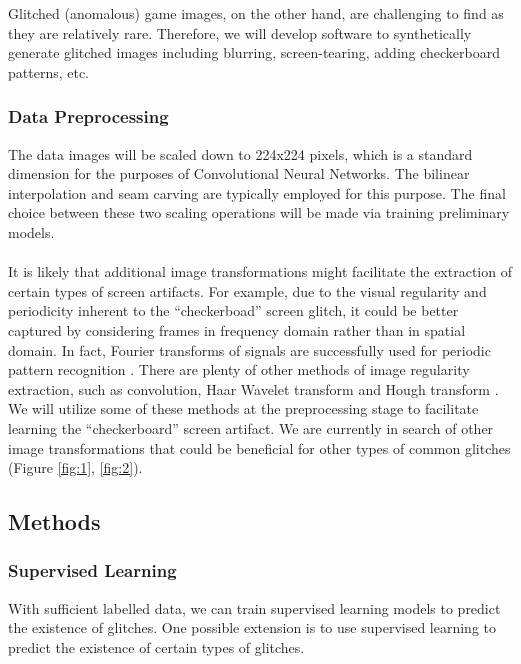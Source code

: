 \documentclass[12pt]{article}
\begin{document}
\noindent Glitched (anomalous) game images, on the other hand, are challenging to find as they are relatively rare. Therefore, we will develop software to synthetically generate glitched images including blurring, screen-tearing, adding checkerboard patterns, etc. 

\subsubsection{Data Preprocessing}

The data images will be scaled down to 224x224 pixels, which is a standard dimension for the purposes of Convolutional Neural Networks. The bilinear interpolation and seam carving are typically employed for this purpose. The final choice between these two scaling operations will be made via training preliminary models.\\\hspace{\fill}\\
\noindent It is likely that additional image transformations might facilitate the extraction of certain types of screen artifacts. For example, due to the visual regularity and periodicity inherent to the ``checkerboad'' screen glitch, it could be better captured by considering frames in frequency domain rather than in spatial domain. In fact, Fourier transforms of signals are successfully used for periodic pattern recognition \cite{russians}. There are plenty of other methods of image regularity extraction, such as convolution, Haar Wavelet transform and Hough transform \cite{transform1, transform2}. We will utilize some of these methods at the preprocessing stage to facilitate learning the ``checkerboard'' screen artifact. We are currently in search of other image transformations that could be beneficial for other types of common glitches (Figure \ref{fig:1}, \ref{fig:2}).







\subsection{Methods}
\subsubsection{Supervised Learning}
With sufficient labelled data, we can train supervised learning models to predict the existence of glitches. One possible extension is to use supervised learning to predict the existence of certain types of glitches.\\
\end{document}
